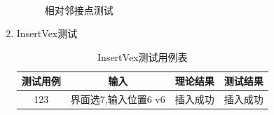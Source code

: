 \documentclass[supercite]{HustGraduPaper}
\theoremstyle{definition}
\begin{document}
\begin{enumerate}
	      \begin{figure}[htb]
		      \centering
		      \quad
		      \quad
		      \\
		      \caption{相对邻接点测试}
	      \end{figure}
	      \newpage
	\item InsertVex测试
	      \begin{table}[htb]
		      \begin{center}
			      \setlength{\tabcolsep}{2.0mm}
			      \caption{InsertVex测试用例表}
			      \label{t7}
			      \begin{tabular}{|c|c|c|c|}
				      \hline
				      测试用例   & 输入                  & 理论结果 & 测试结果 \\
				      \hline
				      \hline
				      123        & 界面选7,输入位置6 v6  & 插入成功 & 插入成功 \\

\end{tabular}
\end{center}
\end{table}
\end{enumerate}
\end{document}
